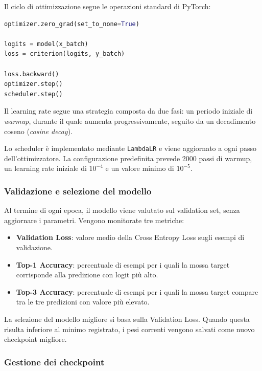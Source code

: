 Il ciclo di ottimizzazione segue le operazioni standard di PyTorch:

\begin{lstlisting}[language=Python, caption={Aggiornamento dei parametri durante il training}, label={lst:training_step}]
optimizer.zero_grad(set_to_none=True)

logits = model(x_batch)
loss = criterion(logits, y_batch)

loss.backward()
optimizer.step()
scheduler.step()
\end{lstlisting}

Il learning rate segue una strategia composta da due fasi: un periodo iniziale di \textit{warmup}, durante il quale aumenta progressivamente, seguito da un decadimento coseno (\textit{cosine decay}).

Lo scheduler è implementato mediante \texttt{LambdaLR} e viene aggiornato a ogni passo dell'ottimizzatore. La configurazione predefinita prevede 2000 passi di warmup, un learning rate iniziale di \(10^{-4}\) e un valore minimo di \(10^{-5}\).


\subsubsection{Validazione e selezione del modello}

Al termine di ogni epoca, il modello viene valutato sul validation set, senza aggiornare i parametri. Vengono monitorate tre metriche:

\begin{itemize}
    \item \textbf{Validation Loss}: valore medio della Cross Entropy Loss sugli esempi di validazione.
    \item \textbf{Top-1 Accuracy}: percentuale di esempi per i quali la mossa target corrisponde alla predizione con logit più alto.
    \item \textbf{Top-3 Accuracy}: percentuale di esempi per i quali la mossa target compare tra le tre predizioni con valore più elevato.
\end{itemize}

La selezione del modello migliore si basa sulla Validation Loss. Quando questa risulta inferiore al minimo registrato, i pesi correnti vengono salvati come nuovo checkpoint migliore.

\subsubsection{Gestione dei checkpoint}

